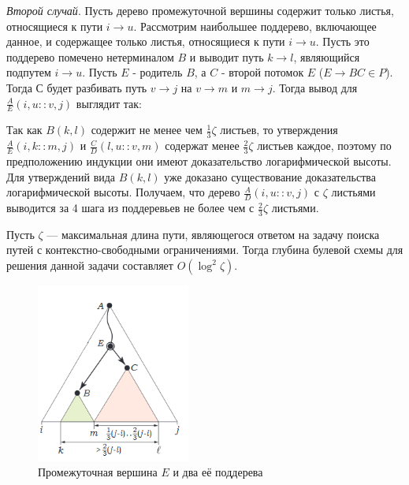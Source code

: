 \textit{Второй случай}. Пусть  дерево промежуточной вершины содержит только листья, относящиеся к пути $i \rightarrow u$. Рассмотрим наибольшее поддерево, включающее данное, и содержащее только листья, относящиеся к пути $i \rightarrow u$. Пусть это поддерево помечено нетерминалом $B$ и выводит путь $k \rightarrow l$, являющийся подпутем $i \rightarrow u$. Пусть $E$ - родитель $B$, а $C$ - второй потомок $E$ ($E \rightarrow BC \in P$). Тогда $С$ будет разбивать путь $v \rightarrow j$ на  $v \rightarrow m$ и  $m \rightarrow j$. Тогда вывод для $\frac{A}{E}(i , u :: v , j)$ выглядит так:
\begin{prooftree}

\end{prooftree}
Так как $B(k, l)$ содержит не менее чем  $\frac{1}{3}\zeta$ листьев, то утверждения $\frac{A}{E}(i , k :: m , j)$ и $\frac{C}{D}(l , u :: v , m)$ содержат менее  $\frac{2}{3}\zeta$ листьев каждое, поэтому по предположению индукции они имеют доказательство логарифмической высоты. Для утверждений вида $B(k, l)$ уже доказано существование доказательства логарифмической высоты. Получаем, что дерево $\frac{A}{D}(i , u :: v , j)$ с $\zeta$ листьями выводится за 4 шага из поддеревьев не более чем с  $\frac{2}{3}\zeta$ листьями.
\begin{lemmarus}\label{Depthzeta}
Пусть $\zeta$ --- максимальная длина пути, являющегося ответом на задачу поиска путей с контекстно-свободными ограничениями. Тогда глубина булевой схемы для решения данной задачи составляет $O(\log^2 \zeta)$.
\end{lemmarus}
\begin{figure}[!]
\centering
\includegraphics[width=0.45\textwidth]{Shemetova/e.png}
\caption{Промежуточная вершина $E$ и два её поддерева}
\label{e}
\end{figure}
